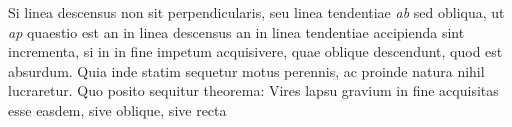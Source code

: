\count{}
\pstart
Si linea descensus non sit perpendicularis, seu linea tendentiae\protect{} \textit{ab} sed obliqua, ut \textit{ap} quaestio est an in linea descensus an in linea tendentiae\protect{} accipienda sint incrementa, si in  in fine impetum\protect{} acquisivere, quae oblique descendunt, quod est absurdum. Quia inde statim sequetur motus perennis\protect{}, ac proinde natura nihil lucraretur. Quo posito sequitur theorema\protect{}: Vires lapsu gravium\protect{} in fine acquisitas esse easdem, sive oblique, sive recta %
